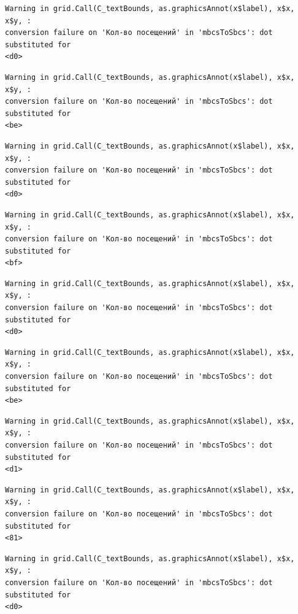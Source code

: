 \documentclass[
  letterpaper,
  DIV=11,
  numbers=noendperiod]{scrartcl}
\begin{document}
\begin{verbatim}
Warning in grid.Call(C_textBounds, as.graphicsAnnot(x$label), x$x, x$y, :
conversion failure on 'Кол-во посещений' in 'mbcsToSbcs': dot substituted for
<d0>
\end{verbatim}

\begin{verbatim}
Warning in grid.Call(C_textBounds, as.graphicsAnnot(x$label), x$x, x$y, :
conversion failure on 'Кол-во посещений' in 'mbcsToSbcs': dot substituted for
<be>
\end{verbatim}

\begin{verbatim}
Warning in grid.Call(C_textBounds, as.graphicsAnnot(x$label), x$x, x$y, :
conversion failure on 'Кол-во посещений' in 'mbcsToSbcs': dot substituted for
<d0>
\end{verbatim}

\begin{verbatim}
Warning in grid.Call(C_textBounds, as.graphicsAnnot(x$label), x$x, x$y, :
conversion failure on 'Кол-во посещений' in 'mbcsToSbcs': dot substituted for
<bf>
\end{verbatim}

\begin{verbatim}
Warning in grid.Call(C_textBounds, as.graphicsAnnot(x$label), x$x, x$y, :
conversion failure on 'Кол-во посещений' in 'mbcsToSbcs': dot substituted for
<d0>
\end{verbatim}

\begin{verbatim}
Warning in grid.Call(C_textBounds, as.graphicsAnnot(x$label), x$x, x$y, :
conversion failure on 'Кол-во посещений' in 'mbcsToSbcs': dot substituted for
<be>
\end{verbatim}

\begin{verbatim}
Warning in grid.Call(C_textBounds, as.graphicsAnnot(x$label), x$x, x$y, :
conversion failure on 'Кол-во посещений' in 'mbcsToSbcs': dot substituted for
<d1>
\end{verbatim}

\begin{verbatim}
Warning in grid.Call(C_textBounds, as.graphicsAnnot(x$label), x$x, x$y, :
conversion failure on 'Кол-во посещений' in 'mbcsToSbcs': dot substituted for
<81>
\end{verbatim}

\begin{verbatim}
Warning in grid.Call(C_textBounds, as.graphicsAnnot(x$label), x$x, x$y, :
conversion failure on 'Кол-во посещений' in 'mbcsToSbcs': dot substituted for
<d0>
\end{verbatim}
\end{document}
